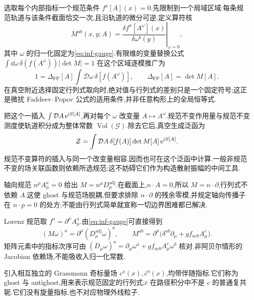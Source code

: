 选取每个内部指标一个规范条件 $f^a[A](x)=0$.先限制到一个局域区域:每条规范轨道与该条件截面恰交一次,且沿轨道的微分可逆.定义算符核
\begin{equation}\label{eq:FP-M}
 M^{ab}(x,y;A)=\left.\frac{\delta f^a[A^\omega](x)}{\delta\omega^b(y)}\right|_{\omega=0},
\end{equation}
其中 $\omega$ 的归一化固定为\eqref{eq:inf-gauge}.有限维的变量替换公式 $\int\dd\omega\,\delta(f(A^\omega))|\det M|=1$ 在这个区域逐模推广为
\[
 1=\Delta_{\mathrm{FP}}[A]\int\mathcal D\omega\,
 \delta[f(A^\omega)],\qquad \Delta_{\mathrm{FP}}[A]=\det M[A].
\]
在真空附近选择固定行列式取向时,绝对值与行列式的差别只是一个固定符号;这正是微扰 Faddeev--Popov 公式的适用条件,并非任意构形上的全局恒等式.

把这个一插入 $\int\mathcal DA\,\mathrm e^{\mathrm i S[A]}$,再对每个 $\omega$ 改变量 $A\mapsto A^{\omega}$.规范不变作用量与规范不变测度使轨道积分成为整体常数 $\operatorname{Vol}(\mathcal G)$.除去它后,真空生成泛函为
\begin{equation}\label{eq:FP-delta}
 \mathcal Z=\int\mathcal DA\,\delta[f(A)]\det M[A]\,\mathrm e^{\mathrm i S[A]}.
\end{equation}
规范不变算符的插入与同一个改变量相容,因而也可在这个泛函中计算.一般非规范不变的场关联函数则依赖所选规范;这不妨碍它们作为构造散射振幅的中间工具.

轴向规范 $n^\mu A_\mu^a=0$ 给出 $M=n^\mu D_\mu^{\mathrm{adj}}$.在截面上,$n\cdot A=0$,所以 $M=n\cdot\partial$,行列式不依赖 $A$.这使 ghost 与规范场脱耦,但要求排除 $n\cdot\partial$ 的残余零模,并规定轴向传播子在 $n\cdot p=0$ 的处方;不能由行列式简单就宣称一切边界困难都已解决.

Lorenz 规范取 $f^a=\partial^\mu A_\mu^a$.由\eqref{eq:inf-gauge}可直接得到
\begin{equation}\label{eq:FP-lorenz}
 (M\omega)^a=\partial^\mu(D_\mu^{\mathrm{adj}}\omega)^a,
 \qquad M^{ab}=\partial^\mu\bigl(\delta^{ab}\partial_\mu+gf_{acb}A_\mu^c\bigr).
\end{equation}
矩阵元素中的指标次序可由 $(D_\mu\omega)^a=\partial_\mu\omega^a+gf_{acb}A_\mu^c\omega^b$ 核对.非阿贝尔情形的 Jacobian 依赖场,不能吸收入归一化常数.

\begin{definition}
引入相互独立的 Grassmann 奇标量场 $c^a(x),\bar c^a(x)$,均带伴随指标.它们称为 ghost 与 antighost,用来表示规范固定的行列式;$\bar c$ 在路径积分中不是 $c$ 的普通复共轭.它们没有旋量指标,也不对应物理外线粒子.
\end{definition}

